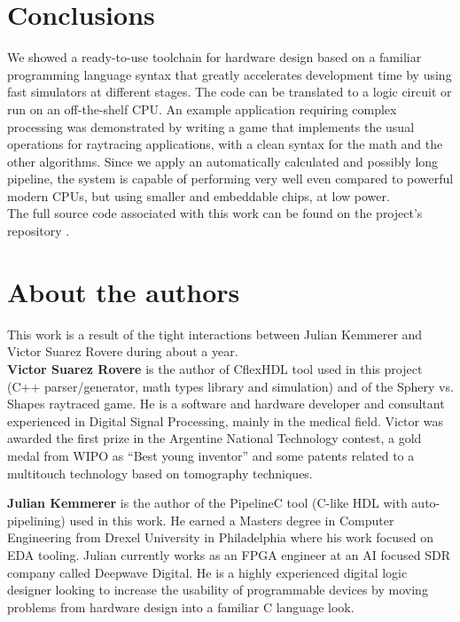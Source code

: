 \documentclass[conference]{IEEEtran}
\begin{document}
\section{Conclusions}

We showed a ready-to-use toolchain for hardware design based on a familiar programming language syntax that greatly accelerates development time by using fast simulators at different stages. The code can be translated to a logic circuit or run on an off-the-shelf CPU. An example application requiring complex processing was demonstrated by writing a game that implements the usual operations for raytracing applications, with a clean syntax for the math and the other algorithms. Since we apply an automatically calculated and possibly long pipeline, the system is capable of performing very well even compared to powerful modern CPUs, but using smaller and embeddable chips, at low power.
\\

The full source code associated with this work can be found on the project's repository \cite{mainrepo}.
\\

\section{About the authors}
This work is a result of the tight interactions between Julian Kemmerer and Victor Suarez Rovere during about a year.
\\

\textbf{Victor Suarez Rovere} is the author of CflexHDL tool used in this project (C++ parser/generator, math types library and simulation) and of the Sphery vs. Shapes raytraced game. He is a software and hardware developer and consultant experienced in Digital Signal Processing, mainly in the medical ﬁeld. Victor was awarded the ﬁrst prize in the Argentine National Technology contest, a gold medal from WIPO as “Best young inventor” and some patents related to a multitouch technology based on tomography techniques. 

\textbf{Julian Kemmerer} is the author of the PipelineC tool (C-like HDL with auto-pipelining) used in this work. He earned a Masters degree in Computer Engineering from Drexel University in Philadelphia where his work focused on EDA tooling. Julian currently works as an FPGA engineer at an AI focused SDR company called Deepwave Digital. He is a highly experienced digital logic designer looking to increase the usability of programmable devices by moving problems from hardware design into a familiar C language look.
\\
\end{document}
